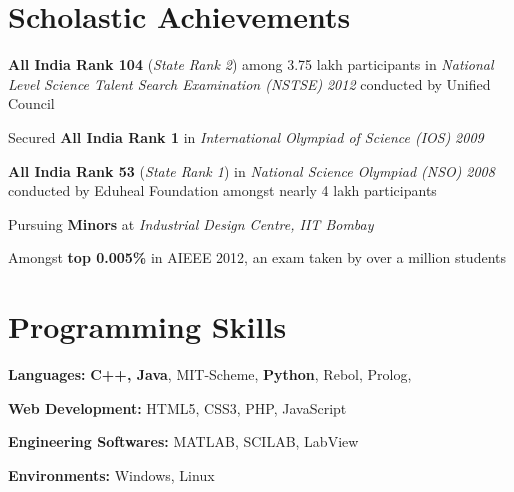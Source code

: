 \documentclass[margin,11pt]{resume}
\begin{document}
\begin{resume}
\section{\mysidestyle Scholastic Achievements}
\begin{list2}
\item \textbf{All India Rank 104} (\textsl{State Rank 2}) among 3.75 lakh participants in \textsl{National Level Science Talent Search Examination (NSTSE)} \textsl{2012} conducted by Unified Council
\item Secured \textbf{All India Rank 1} in \textsl{International Olympiad of Science (IOS)} \textsl{2009}
\item \textbf{All India Rank 53} (\textsl{State Rank 1}) in \textsl{National Science Olympiad (NSO)} \textsl{2008} conducted by Eduheal Foundation amongst nearly 4 lakh participants
\item Pursuing \textbf{Minors} at \textsl{Industrial Design Centre, IIT Bombay}
\item Amongst \textbf{top 0.005\%} in AIEEE 2012, an exam taken by over a million students
 \end{list2}
 
\section{\mysidestyle Programming Skills}
\begin{list2}
\item \textbf{Languages:} \textbf{C++, Java}, MIT-Scheme, \textbf{Python}, Rebol, Prolog, \LaTeXe{}
\item \textbf{Web Development:} HTML5, CSS3, PHP, JavaScript
\item \textbf{Engineering Softwares:} MATLAB, SCILAB, LabView
\item \textbf{Environments:} Windows, Linux
\end{list2}


\end{resume}
\end{document}
